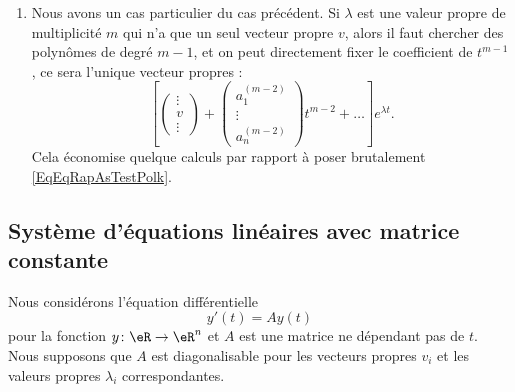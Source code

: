 \begin{enumerate}
\item\label{ItemRapSystDe}
Nous avons un cas particulier du cas précédent. Si $\lambda$ est une valeur propre de multiplicité $m$ qui n'a que un seul vecteur propre $v$, alors il faut chercher des polynômes de degré $m-1$, et on peut directement fixer le coefficient de $t^{m-1}$, ce sera l'unique vecteur propres :
\begin{equation}
\left[
	\begin{pmatrix}
	\vdots	\\ 
	v	\\ 
	\vdots	
\end{pmatrix}+
\begin{pmatrix}
	a_1^{(m-2)}	\\ 
	\vdots	\\ 
	a_n^{(m-2)}	
\end{pmatrix}t^{m-2}+\ldots
\right] e^{\lambda t}.
\end{equation}
Cela économise quelque calculs par rapport à poser brutalement \eqref{EqEqRapAsTestPolk}.

\end{enumerate}
\let\theenumi\oldTheEnumi

\subsection{Système d'équations linéaires avec matrice constante}

Nous considérons l'équation différentielle
\begin{equation}    \label{EqOOsXZJ}
    y'(t)=Ay(t)
\end{equation}
pour la fonction \( y\colon \eR\to \eR^n\) et \( A\) est une matrice ne dépendant pas de \( t\). Nous supposons que \( A\) est diagonalisable pour les vecteurs propres \( v_i\) et les valeurs propres \( \lambda_i\) correspondantes.


